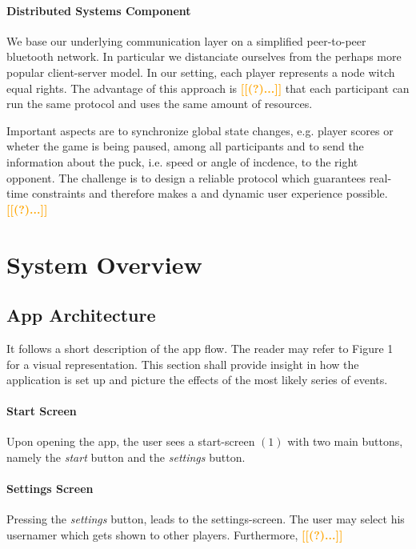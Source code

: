 \documentclass{report}
\newcommand{\todo}[1]{\textsf{\textbf{\textcolor{orange}{[[#1]]}}}}
\begin{document}
\paragraph{Distributed Systems Component} We base our underlying communication layer on a simplified peer-to-peer bluetooth network. In particular we distanciate ourselves from the perhaps more popular client-server model. In our setting, each player represents a node witch equal rights. The advantage of this approach is \todo{(?)...} that each participant can run the same protocol and uses the same amount of resources. 

Important aspects are to synchronize global state changes, e.g. player scores or wheter the game is being paused, among all participants and to send the information about the puck, i.e. speed or angle of incdence, to the right opponent. The challenge is to design a reliable protocol which guarantees real-time constraints and therefore makes a and dynamic user experience possible. \todo{(?)...}

\section{System Overview}

\subsection{App Architecture} 
It follows a short description of the app flow. The reader may refer to Figure 1 for a visual representation. This section shall provide insight in how the application is set up and picture the effects of the most likely series of events.

\paragraph{Start Screen}
 Upon opening the app, the user sees a start-screen $(1)$ with two main buttons, namely the \textit{start} button and the \textit{settings} button. 

\paragraph{Settings Screen}
Pressing the \textit{settings} button, leads to the settings-screen. The user may select his usernamer which gets shown to other players. Furthermore, \todo{(?)...}
\end{document}
